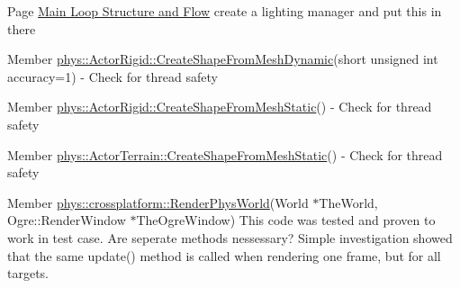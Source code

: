 \label{dd/da0/todo__todo000034}
\hypertarget{dd/da0/todo__todo000034}{}
 
\begin{DoxyDescription}
\item[Page \hyperlink{mainloop1}{Main Loop Structure and Flow} ]create a lighting manager and put this in there 
\end{DoxyDescription}

\label{dd/da0/todo__todo000001}
\hypertarget{dd/da0/todo__todo000001}{}
 
\begin{DoxyDescription}
\item[Member \hyperlink{classphys_1_1ActorRigid_aab4a408ce0724be6adf4c9f51f55f8a1}{phys::ActorRigid::CreateShapeFromMeshDynamic}(short unsigned int accuracy=1) ]-\/ Check for thread safety 
\end{DoxyDescription}

\label{dd/da0/todo__todo000002}
\hypertarget{dd/da0/todo__todo000002}{}
 
\begin{DoxyDescription}
\item[Member \hyperlink{classphys_1_1ActorRigid_a84554dcaaf2475ba0ec7dcb9235050ac}{phys::ActorRigid::CreateShapeFromMeshStatic}() ]-\/ Check for thread safety 
\end{DoxyDescription}

\label{dd/da0/todo__todo000003}
\hypertarget{dd/da0/todo__todo000003}{}
 
\begin{DoxyDescription}
\item[Member \hyperlink{classphys_1_1ActorTerrain_a2403c40af6799e67c9aff1520b02dc0b}{phys::ActorTerrain::CreateShapeFromMeshStatic}() ]-\/ Check for thread safety 
\end{DoxyDescription}

\label{dd/da0/todo__todo000004}
\hypertarget{dd/da0/todo__todo000004}{}
 
\begin{DoxyDescription}
\item[Member \hyperlink{namespacephys_1_1crossplatform_a11ab7359564519dc966f997c98109f6e}{phys::crossplatform::RenderPhysWorld}(World $\ast$TheWorld, Ogre::RenderWindow $\ast$TheOgreWindow) ]This code was tested and proven to work in test case. Are seperate methods nessessary? Simple investigation showed that the same update() method is called when rendering one frame, but for all targets. 
\end{DoxyDescription}


